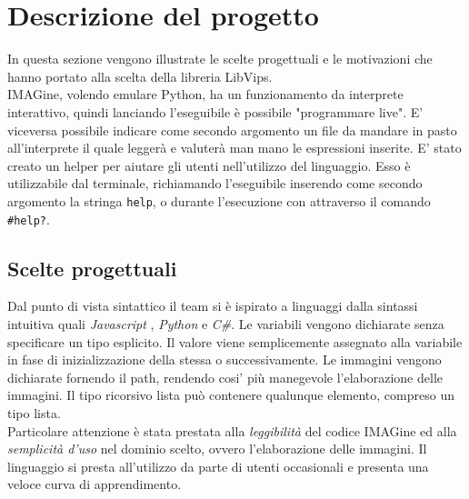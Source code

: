 \documentclass[10pt]{article}
\begin{document}
\section{Descrizione del progetto}In questa sezione vengono illustrate le scelte progettuali e le motivazioni che hanno portato alla scelta della libreria LibVips.\\
IMAGine, volendo emulare Python, ha un funzionamento da interprete interattivo, quindi lanciando l'eseguibile è possibile "programmare  live". E' viceversa possibile indicare come secondo argomento un file da mandare in pasto all'interprete il quale leggerà e valuterà man mano le espressioni inserite. E' stato creato un helper per aiutare gli utenti nell'utilizzo del linguaggio. Esso è utilizzabile dal terminale, richiamando l'eseguibile inserendo come secondo argomento la stringa \texttt{help}, o durante l'esecuzione con attraverso il comando \texttt{\#help?}.
\subsection{Scelte progettuali}
Dal punto di vista sintattico il team si è ispirato a linguaggi dalla sintassi intuitiva quali \textit{Javascript} , \textit{Python} e \textit{C\#}. Le variabili vengono dichiarate senza specificare un tipo esplicito. Il valore viene semplicemente assegnato alla variabile in fase di inizializzazione della stessa o successivamente. Le immagini vengono dichiarate fornendo il path, rendendo cosi' più manegevole l'elaborazione delle immagini. Il tipo ricorsivo lista può contenere qualunque elemento, compreso un tipo lista.\\
Particolare attenzione è stata prestata alla \textit{leggibilità} del codice IMAGine ed alla \textit{semplicità d'uso} nel dominio scelto, ovvero l'elaborazione delle immagini. Il linguaggio si presta all'utilizzo da parte di utenti occasionali e presenta una veloce curva di apprendimento.
\end{document}
